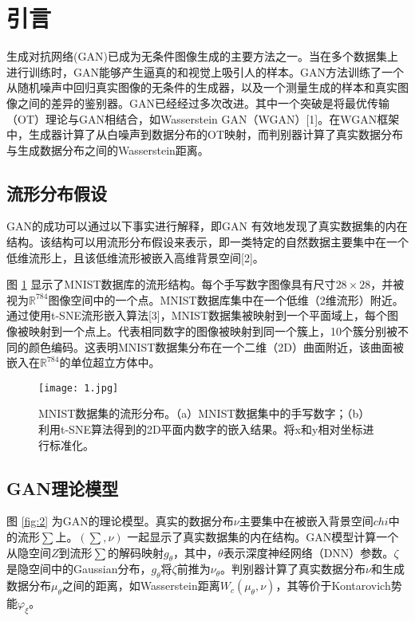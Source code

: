 
\newpage

\section{引言}

生成对抗网络(GAN)已成为无条件图像生成的主要方法之一。当在多个数据集上进行训练时，GAN能够产生逼真的和视觉上吸引人的样本。GAN方法训练了一个从随机噪声中回归真实图像的无条件的生成器，以及一个测量生成的样本和真实图像之间的差异的鉴别器。GAN已经经过多次改进。其中一个突破是将最优传输（OT）理论与GAN相结合，如Wasserstein GAN（WGAN）[1]。在WGAN框架中，生成器计算了从白噪声到数据分布的OT映射，而判别器计算了真实数据分布与生成数据分布之间的Wasserstein距离。

\subsection{流形分布假设}

GAN的成功可以通过以下事实进行解释，即GAN
有效地发现了真实数据集的内在结构。该结构可以用流形分布假设来表示，即一类特定的自然数据主要集中在一个低维流形上，且该低维流形被嵌入高维背景空间[2]。

图 \ref{fig:1} 显示了MNIST数据库的流形结构。每个手写数字图像具有尺寸$28 \times 28$，并被视为$\mathbb{R}^{784}$图像空间中的一个点。MNIST数据库集中在一个低维（2维流形）附近。通过使用t-SNE流形嵌入算法[3]，MNIST数据集被映射到一个平面域上，每个图像被映射到一个点上。代表相同数字的图像被映射到同一个簇上，10个簇分别被不同的颜色编码。这表明MNIST数据集分布在一个二维（2D）曲面附近，该曲面被嵌入在$\mathbb{R}^{784}$的单位超立方体中。

\begin{figure}[h]
	\centering
	\texttt{[image: 1.jpg]}
	
	\caption{MNIST数据集的流形分布。（a）MNIST数据集中的手写数字；（b）利用t-SNE算法得到的2D平面内数字的嵌入结果。将x和y相对坐标进行标准化。}
	\label{fig:1}
\end{figure}

\subsection{GAN理论模型}

图 \ref{fig:2} 为GAN的理论模型。真实的数据分布$\nu$主要集中在被嵌入背景空间$chi$中的流形$\sum$上。$(\sum,\nu)$
一起显示了真实数据集的内在结构。GAN模型计算一个从隐空间$Z$到流形$\sum$的解码映射$g_{\theta}$，其中，$\theta$表示深度神经网络（DNN）参数。$\zeta$是隐空间中的Gaussian分布，$g_{\theta}$将$\zeta$前推为$\nu_{\theta}$。判别器计算了真实数据分布$\nu$和生成数据分布$\mu_{\theta}$之间的距离，如Wasserstein距离$W_c(\mu_{\theta},\nu)$，其等价于Kontarovich势能$\varphi_{\xi}$。


